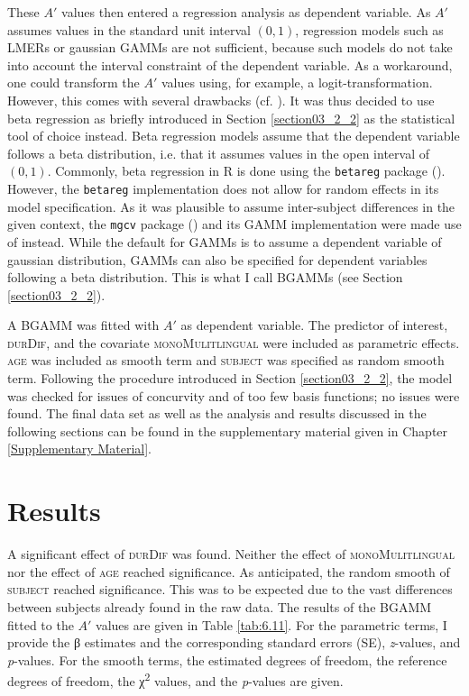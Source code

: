 These $A'$ values then entered a regression analysis as dependent variable. As $A'$ assumes values in the standard unit interval $(0,1)$, regression models such as LMERs or gaussian GAMMs are not sufficient, because such models do not take into account the interval constraint of the dependent variable. As a workaround, one could transform the $A'$ values using, for example, a logit-transformation. However, this comes with several drawbacks (cf. \cite{Cribari2010}). It was thus decided to use beta regression as briefly introduced in Section \ref{section03_2_2} as the statistical tool of choice instead. Beta regression models assume that the dependent variable follows a beta distribution, i.e. that it assumes values in the open interval of $(0,1)$. Commonly, beta regression in R is done using the \texttt{betareg} package (\cite{Cribari2010}). However, the \texttt{betareg} implementation does not allow for random effects in its model specification. As it was plausible to assume inter-subject differences in the given context, the \texttt{mgcv} package (\cite{Wood2017}) and its GAMM implementation were made use of instead. While the default for GAMMs is to assume a dependent variable of gaussian distribution, GAMMs can also be specified for dependent variables following a beta distribution. This is what I call BGAMMs (see Section \ref{section03_2_2}).

A BGAMM was fitted with $A'$ as dependent variable. The predictor of interest, \textsc{durDif}, and the covariate \textsc{monoMulitlingual} were included as parametric effects. \textsc{age} was included as smooth term and \textsc{subject} was specified as random smooth term. Following the procedure introduced in Section \ref{section03_2_2}, the model was checked for issues of concurvity and of too few basis functions; no issues were found. The final data set as well as the analysis and results discussed in the following sections can be found in the supplementary material given in Chapter \ref{Supplementary Material}.

\section{Results}\label{section06_3}

A significant effect of \textsc{durDif} was found. Neither the effect of \textsc{monoMulitlingual} nor the effect of \textsc{age} reached significance. As anticipated, the random smooth of \textsc{subject} reached significance. This was to be expected due to the vast differences between subjects already found in the raw data. The results of the BGAMM fitted to the $A'$ values are given in Table \ref{tab:6.11}. For the parametric terms, I provide the β estimates and the corresponding standard errors (SE), \textit{z}-values, and \textit{p}-values. For the smooth terms, the estimated degrees of freedom, the reference degrees of freedom, the χ\textsuperscript{2} values, and the \textit{p}-values are given.

